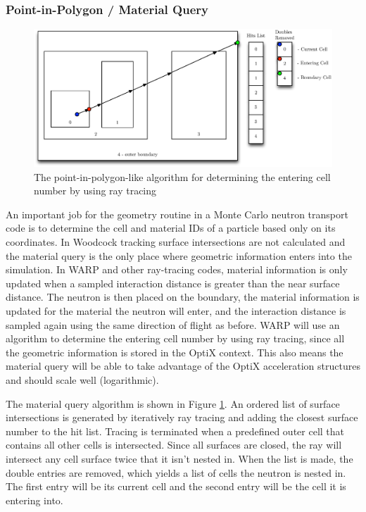 \subsubsection{Point-in-Polygon / Material Query}

\begin{figure}[h!] 
  \centering
    \includegraphics[width=1.0\textwidth]{graphics/whereami.eps}
     \caption{The point-in-polygon-like algorithm for determining the entering cell number by using ray tracing \label{whereami} }
\end{figure}

An important job for the geometry routine in a Monte Carlo neutron transport code is to determine the cell and material IDs of a particle based only on its coordinates.  In Woodcock tracking surface intersections are not calculated and the material query is the only place where geometric information enters into the simulation. In WARP and other ray-tracing codes, material information is only updated when a sampled interaction distance is greater than the near surface distance.  The neutron is then placed on the boundary, the material information is updated for the material the neutron will enter, and the interaction distance is sampled again using the same direction of flight as before.  WARP will use an algorithm to determine the entering cell number by using ray tracing, since all the geometric information is stored in the OptiX context.  This also means the material query will be able to take advantage of the OptiX acceleration structures and should scale well (logarithmic).

The material query algorithm is shown in Figure \ref{whereami}.  An ordered list of surface intersections is generated by iteratively ray tracing and adding the closest surface number to the hit list.  Tracing is terminated when a predefined outer cell that contains all other cells is intersected.  Since all surfaces are closed, the ray will intersect any cell surface twice that it isn't nested in.  When the list is made, the double entries are removed, which yields a list of cells the neutron is nested in.  The first entry will be its current cell and the second entry will be the cell it is entering into.  

